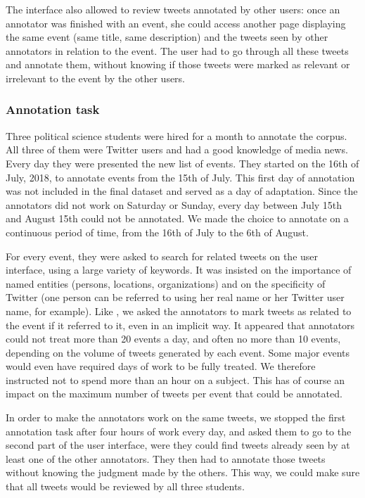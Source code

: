 The interface also allowed to review tweets annotated by other users: once an annotator was finished with an event, she could access another page displaying the same event (same title, same description) and the tweets seen by other annotators in relation to the event. The user had to go through all these tweets and annotate them, without knowing if those tweets were marked as relevant or irrelevant to the event by the other users.

		\subsubsection{Annotation task}
	Three political science students were hired for a month to annotate the corpus. All three of them were Twitter users and had a good knowledge of media news. Every day they were presented the new list of events. They started on the 16th of July, 2018, to annotate events from the 15th of July. This first day of annotation was not included in the final dataset and served as a day of adaptation. Since the annotators did not work on Saturday or Sunday, every day between July 15th and August 15th could not be annotated. We made the choice to annotate on a continuous period of time, from the 16th of July to the 6th of August.


For every event, they were asked to search for related tweets on the user interface, using a large variety of keywords. It was insisted on the importance of named entities (persons, locations, organizations) and on the specificity of Twitter (one person can be referred to using her real name or her Twitter user name, for example). Like \citet{mcminn_building_2013}, we asked the annotators to mark tweets as related to the event if it referred to it, even in an implicit way. It appeared that annotators could not treat more than 20 events a day, and often no more than 10 events, depending on the volume of tweets generated by each event. Some major events would even have required days of work to be fully treated. We therefore instructed not to spend more than an hour on a subject. This has of course an impact on the maximum number of tweets per event that could be annotated. 


In order to make the annotators work on the same tweets, we stopped the first annotation task after four hours of work every day, and asked them to go to the second part of the user interface, were they could find tweets already seen by at least one of the other annotators. They then had to annotate those tweets without knowing the judgment made by the others. This way, we could make sure that all tweets would be reviewed by all three students.

